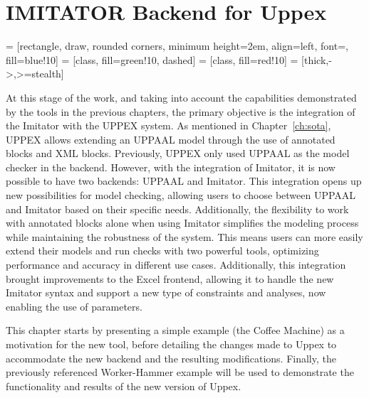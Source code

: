 
\chapter{IMITATOR Backend for Uppex}


\usetikzlibrary{shapes.geometric, arrows, positioning}

 = [rectangle, draw, rounded corners, minimum height=2em, align=left, font=\ttfamily, fill=blue!10]
 = [class, fill=green!10, dashed]
 = [class, fill=red!10]
 = [thick,->,>=stealth]

At this stage of the work, and taking into account the capabilities demonstrated by the tools in the previous chapters, the primary objective is the integration of the Imitator with the UPPEX system. As mentioned in Chapter~\ref{ch:sota}, UPPEX allows extending an UPPAAL model through the use of annotated blocks and XML blocks. Previously, UPPEX only used UPPAAL as the model checker in the backend. However, with the integration of Imitator, it is now possible to have two backends: UPPAAL and Imitator. This integration opens up new possibilities for model checking, allowing users to choose between UPPAAL and Imitator based on their specific needs. Additionally, the flexibility to work with annotated blocks alone when using Imitator simplifies the modeling process while maintaining the robustness of the system. This means users can more easily extend their models and run checks with two powerful tools, optimizing performance and accuracy in different use cases. Additionally, this integration brought improvements to the Excel frontend, allowing it to handle the new Imitator syntax and support a new type of constraints and analyses, now enabling the use of parameters.

This chapter starts by presenting a simple example (the Coffee Machine) as a motivation for the new tool, before detailing the changes made to Uppex to accommodate the new backend and the resulting modifications. Finally, the previously referenced Worker-Hammer example will be used to demonstrate the functionality and results of the new version of Uppex.

